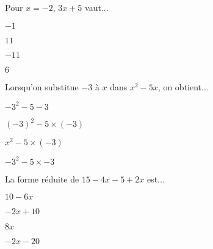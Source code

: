 
\begin{QCM}
\begin{GroupeQCM}

\begin{exercice}
Pour $x = -2$, $3x +5$ vaut...
\begin{ChoixQCM}{4}
\item $-1$
\item $11$
\item $-11$
\item $6$
\end{ChoixQCM}

\begin{corrige}
\end{corrige}
\end{exercice}












\begin{exercice}
Lorsqu'on substitue $-3$ à $x$ dans $x^2 -5x$, on obtient...
\begin{ChoixQCM}{4}
\item $-3^2 -5 -3$
\item $(-3)^2 -5 \times (-3)$
\item $x^2 -5 \times (-3)$
\item $-3^2 -5 \times -3$
\end{ChoixQCM}

\begin{corrige}
\end{corrige}
\end{exercice}


\begin{exercice}
La forme réduite de $15 -4x -5 + 2x$ est...
\begin{ChoixQCM}{4}
\item $10-6x$
\item $-2x+10$
\item $8x$
\item $-2x-20$
\end{ChoixQCM}

\begin{corrige}
\end{corrige}
\end{exercice}




\end{GroupeQCM}
\end{QCM}

